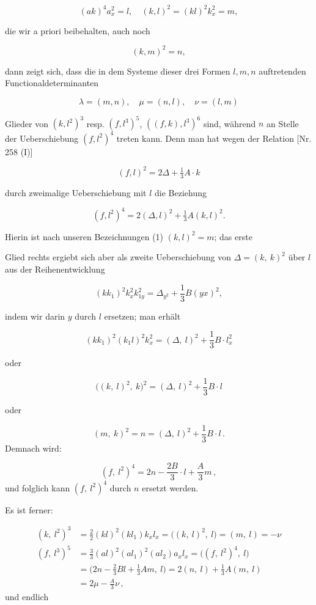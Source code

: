 \documentclass[11pt]{article}
\providecommand{\weberpage}[1]{}
\providecommand{\weq}[2]{\begin{equation}\tag{#1}#2\end{equation}}
\let\Delta\varDelta
\begin{document}
\weq{1}{(ak)^4 a_x^2 = l, \quad (k, l)^2 = (kl)^2 k_x^2 = m,}

die wir a priori beibehalten, auch noch

\[
(k, m)^2 = n,
\]

dann zeigt sich, dass die in dem Systeme dieser drei Formen $l, m, n$
auftretenden Functionaldeterminanten

\weq{2}{\lambda = (m, n), \quad \mu = (n, l), \quad \nu = (l, m)}

Glieder von $(k, l^2)^3$ resp. $(f, l^3)^5$, $((f, k), l^3)^6$ sind, während $n$ an
Stelle der Ueberschiebung $(f, l^2)^4$ treten kann. Denn man hat wegen
der Relation [Nr. 258 (I)]

\[
(f, l)^2 = 2\varDelta + \tfrac{1}{3} A \cdot k
\]

durch zweimalige Ueberschiebung mit $l$ die Beziehung

\[
(f, l^2)^4 = 2(\varDelta, l)^2 + \tfrac{1}{3} A (k, l)^2.
\]

Hierin ist nach unseren Bezeichnungen (1) $(k, l)^2 = m$; das erste


\weberpage{285}

Glied rechts ergiebt sich aber als zweite Ueberschiebung von $\Delta=(k,\ k)^2$
über $l$ aus der Reihenentwicklung

\[
(kk_1)^2 k_x^2 k_{1y}^2 = \Delta_{y^2} + \frac{1}{3} B (yx)^2 ,
\]

indem wir darin $y$ durch $l$ ersetzen; man erhält

\[
(kk_1)^2 (k_1 l)^2 k_x^2 = (\Delta,\ l)^2 + \frac{1}{3} B \cdot l_x^2
\]

oder

\[
\big((k,\ l)^2,\ k\big)^2 = (\Delta,\ l)^2 + \frac{1}{3} B \cdot l
\]

oder

\weq{3}{(m,\ k)^2 = n = (\Delta,\ l)^2 + \frac{1}{3} B \cdot l\,.}
Demnach wird:

\weq{4}{(f,\ l^2)^4 = 2n - \frac{2B}{3}\cdot l + \frac{A}{3} m\,,}
und folglich kann $(f,\ l^2)^4$ durch $n$ ersetzt werden.

Es ist ferner:

\[
\begin{aligned}
(k,\ l^2)^3 &= \frac{2}{2} (kl)^2(kl_1)k_xl_x = \big((k,\ l)^2,\ l\big) = (m,\ l) = -\nu\\[4pt]
(f,\ l^3)^5 &= \frac{3}{3} (al)^2(al_1)^2(al_2)a_xl_x = \big((f,\ l^2)^4,\ l\big)\\
&= \Big(2n-\frac{2}{3}Bl+\frac{1}{3}Am,\ l\Big) = 2(n,\ l)+\frac{1}{3}A(m,\ l)\\
&= 2\mu-\frac{A}{3}\nu\,,
\end{aligned}
\]
und endlich
\end{document}
